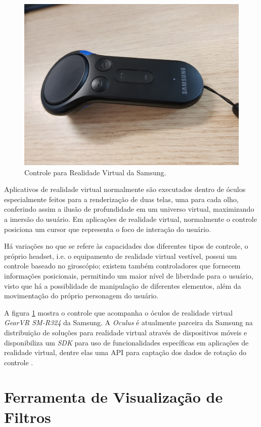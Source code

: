 \documentclass[conference]{IEEEtran}
\begin{document}
\begin{figure}[ht]
\centering
\includegraphics[width=.6\textwidth]{images/gear_controller.jpg}
\caption{Controle para Realidade Virtual da Samsung.}
\label{fig:vrcontroller}
\end{figure}

Aplicativos de realidade virtual normalmente são executados dentro de óculos especialmente feitos para a renderização de duas telas, uma para cada olho, conferindo assim a ilusão de profundidade em um universo virtual, maximizando a imersão do usuário. Em aplicações de realidade virtual, normalmente o controle posiciona um cursor que representa o foco de interação do usuário.

Há variações no que se refere às capacidades dos diferentes tipos de controle, o próprio headset, i.e. o equipamento de realidade virtual vestível, possui um controle baseado no giroscópio; existem também controladores que fornecem informações posicionais, permitindo um maior nível de liberdade para o usuário, visto que há a possiblidade de manipulação de diferentes elementos, além da movimentação do próprio personagem do usuário.

A figura \ref{fig:vrcontroller} mostra o controle que acompanha o óculos de realidade virtual \textit{GearVR SM-R324} da Samsung. A \textit{Oculus} é atualmente parceira da Samsung na distribuição de soluções para realidade virtual através de dispositivos móveis e disponibiliza um \textit{SDK} para uso de funcionalidades específicas em aplicações de realidade virtual, dentre elas uma API para captação dos dados de rotação do controle \cite{gearvrinputdocs}.





\section{Ferramenta de Visualização de Filtros} \label{sec:viztool}
\end{document}
